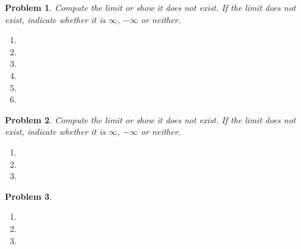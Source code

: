 \documentclass{article}
\renewcommand{\fcProblemRef}{\theproblem.\theenumi}
\newtheorem{problem}{Problem}
\begin{document}
\begin{problem}Compute the limit or show it does not exist. If the limit does not exist, indicate whether it is $\infty$, $-\infty$ or neither.
\begin{multicols}{2}
\begin{enumerate}[ref={\fcProblemRef}]
\item 
\item 
\item 
\item 
\item 
\item 

\end{enumerate}
\end{multicols}
\end{problem}

\begin{problem}Compute the limit or show it does not exist. If the limit does not exist, indicate whether it is $\infty$, $-\infty$ or neither.
\begin{enumerate}[ref={\fcProblemRef}]
\item 
\item 
\item 
\end{enumerate}
\end{problem}




\begin{problem}
\begin{enumerate}[ref={\fcProblemRef}]
\item 
\item 
\item 

\end{enumerate}
\end{problem}

\end{document}
